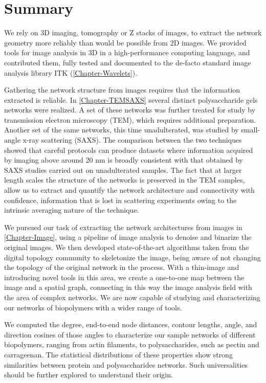 \section{Summary}%
\label{sec:conclusions_summary}

We rely on 3D imaging, tomography or Z stacks of images, to extract the network geometry more reliably than would be possible from 2D images. We provided tools for image analysis in 3D in a high-performance computing language, and contributed them, fully tested and documented to the de-facto standard image analysis library ITK (\autoref{Chapter-Wavelets}).

Gathering the network structure from images requires that the information extracted is reliable. In \autoref{Chapter-TEMSAXS} several distinct polysaccharide gels networks were realized. A set of these networks was further treated for study by transmission electron microscopy (TEM), which requires additional preparation. Another set of the same networks, this time unadulterated, was studied by small-angle x-ray scattering (SAXS). The comparison between the two techniques showed that careful protocols can produce datasets where information acquired by imaging above around 20 nm is broadly consistent with that obtained by SAXS studies carried out on unadulterated samples.
The fact that at larger length scales the structure of the networks is preserved in the TEM samples, allow us to extract and quantify the network architecture and connectivity with confidence, information that is lost in scattering experiments owing to the intrinsic averaging nature of the technique.

We pursued our task of extracting the network architectures from images in \autoref{Chapter-Image}, using a pipeline of image analysis to denoise and binarize the original images. We then developed state-of-the-art algorithms taken from the digital topology community to skeletonize the image, being aware of not changing the topology of the original network in the process. With a thin-image and introducing novel tools in this area, we create a one-to-one map between the image and a spatial graph, connecting in this way the image analysis field with the area of complex networks. We are now capable of studying and characterizing our networks of biopolymers with a wider range of tools.

We computed the degree, end-to-end node distances, contour lengths, angle, and direction cosines of those angles to characterize our sample networks of different biopolymers, ranging from actin filaments, to polysaccharides, such as pectin and carrageenan. The statistical distributions of these properties show strong similarities between protein and polysaccharides networks. Such universalities should be further explored to understand their origin.

